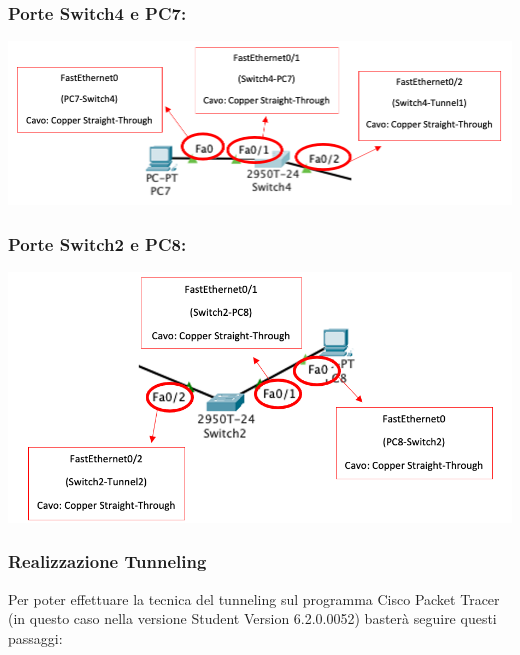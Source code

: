\subsubsection*{Porte Switch4 e PC7:}

\begin{center}
    \includegraphics[width=\linewidth]{images/07.routing-sicurezza/tunneling/08.png}
\end{center}

\subsubsection*{Porte Switch2 e PC8:}

\begin{center}
    \includegraphics[width=\linewidth]{images/07.routing-sicurezza/tunneling/09.png}
\end{center}

\subsubsection{Realizzazione Tunneling}
Per poter effettuare la tecnica del tunneling sul programma Cisco Packet Tracer (in questo caso nella versione Student Version 6.2.0.0052) basterà seguire questi passaggi:

